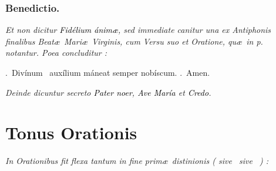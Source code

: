 \documentclass[12pt]{article} %
\newenvironment{rubric}{\color{benred8} \itshape \leftskip 0in \setlength{\parindent}{0.25in}}{\vspace{2 mm}}
\newenvironment{response}{\leftskip 0in \setlength{\parindent}{0in}}{\vspace{2 mm}}
\let\oldgresixstar\gresixstar
\renewcommand{\gresixstar}{\textcolor{benred8}{\oldgresixstar}}
\let\oldgredagger\gredagger
\renewcommand{\gredagger}{\textcolor{benred8}{\oldgredagger}}
\let\oldVbar\Vbar
\renewcommand{\Vbar}{\textcolor{benred8}{\oldVbar .}}
\let\oldRbar\Rbar
\renewcommand{\Rbar}{\textcolor{benred8}{\oldRbar .}}
\let\oldgrealtcross\grealtcross
\renewcommand{\grealtcross}{\textcolor{benred8}{\oldgrealtcross}}
\begin{document}
\vspace{1.5mm}

\subsubsection*{Benedictio.}

\gresetfirstlineaboveinitial{\small \textsc{ \textbf{\textcolor{benred8}{}}}}{\small \textsc{ \textbf{\textcolor{benred8}{}}}}

\vspace{1.5mm}

\begin{rubric}
Et non dicitur \textcolor{black}{\emph{Fid\'{e}lium \'{a}nim\ae}}, sed immediate canitur una ex Antiphonis finalibus Beat\ae\ Mari\ae\ Virginis, cum Versu suo et Oratione, qu\ae\ in p.~\pageref{sec:AntBMV} notantur. Poea concluditur :

\end{rubric}

\begin{response}
\Vbar\ Div\'{i}num \grealtcross\ aux\'{i}lium m\'{a}neat semper nob\'{i}scum. \Rbar\ Amen.

\end{response}

\begin{rubric}
Deinde dicuntur secreto \textcolor{black}{\emph{Pater noer}}, \textcolor{black}{\emph{Ave Mar\'{i}a}} et \textcolor{black}{\emph{Credo}}.

\end{rubric}

\newpage


\section*{Tonus Orationis}
\label{sec:TonusOrationis}

\thispagestyle{plain}



\vspace{1mm}

\begin{rubric}
In Orationibus fit flexa tantum in fine prim\ae\ distinionis ( sive \gredagger\ sive \gresixstar\ ) :

\end{rubric}
\end{document}

